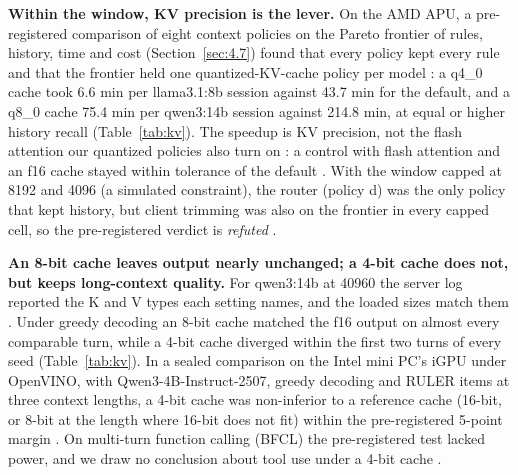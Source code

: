 \documentclass[conference,10pt]{IEEEtran}
\begin{document}
\textbf{Within the window, KV precision is the lever.} On the AMD APU, a pre-registered comparison of eight context policies on the Pareto frontier of rules, history, time and cost (Section~\ref{sec:4.7}) found that every policy kept every rule and that the frontier held one quantized-KV-cache policy per model%
: a q4\_0 cache took 6.6 min per llama3.1:8b session against 43.7 min for the default, and a q8\_0 cache 75.4 min per qwen3:14b session against 214.8 min, at equal or higher history recall (Table~\ref{tab:kv}). The speedup is KV precision, not the flash attention our quantized policies also turn on%
: a control with flash attention and an f16 cache stayed within tolerance of the default%
. With the window capped at 8192 and 4096 (a simulated constraint), the router (policy d) was the only policy that kept history, but client trimming was also on the frontier in every capped cell, so the pre-registered verdict is \emph{refuted}%
.

\textbf{An 8-bit cache leaves output nearly unchanged; a 4-bit cache does not, but keeps long-context quality.} For qwen3:14b at 40960 the server log reported the K and V types each setting names, and the loaded sizes match them%
. Under greedy decoding an 8-bit cache matched the f16 output on almost every comparable turn, while a 4-bit cache diverged within the first two turns of every seed %
(Table~\ref{tab:kv}). In a sealed comparison on the Intel mini PC's iGPU under OpenVINO, with Qwen3-4B-Instruct-2507, greedy decoding and RULER items at three context lengths, a 4-bit cache was non-inferior to a reference cache (16-bit, or 8-bit at the length where 16-bit does not fit) within the pre-registered 5-point margin%
. On multi-turn function calling (BFCL) the pre-registered test lacked power, and we draw no conclusion about tool use under a 4-bit cache%
.
\end{document}
